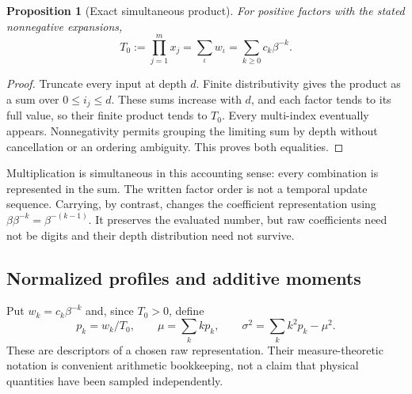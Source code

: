 \documentclass[11pt,a4paper]{article}
\newtheorem{proposition}[theorem]{Proposition}
\begin{document}
\begin{proposition}[Exact simultaneous product]
For positive factors with the stated nonnegative expansions,
\begin{equation}
 T_0:=\prod_{j=1}^m x_j=\sum_{\iota}w_{\iota}
      =\sum_{k\ge0}c_k\beta^{-k}.
 \label{eq:sumproduct}
\end{equation}
\end{proposition}
\begin{proof}
Truncate every input at depth $d$. Finite distributivity gives the product as a sum over $0\le i_j\le d$. These sums increase with $d$, and each factor tends to its full value, so their finite product tends to $T_0$. Every multi-index eventually appears. Nonnegativity permits grouping the limiting sum by depth without cancellation or an ordering ambiguity. This proves both equalities.
\end{proof}
Multiplication is simultaneous in this accounting sense: every combination is represented in the sum. The written factor order is not a temporal update sequence. Carrying, by contrast, changes the coefficient representation using $\beta\beta^{-k}=\beta^{-(k-1)}$. It preserves the evaluated number, but raw coefficients need not be digits and their depth distribution need not survive.

\subsection{Normalized profiles and additive moments}
Put $w_k=c_k\beta^{-k}$ and, since $T_0>0$, define
\begin{equation}
 p_k=w_k/T_0,\qquad
 \mu=\sum_k kp_k,\qquad
 \sigma^2=\sum_k k^2p_k-\mu^2.
 \label{eq:profile}
\end{equation}
These are descriptors of a chosen raw representation. Their measure-theoretic notation is convenient arithmetic bookkeeping, not a claim that physical quantities have been sampled independently.
\end{document}
